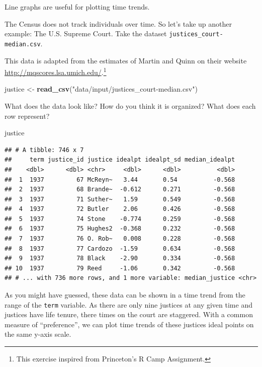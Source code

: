 \documentclass[]{book}
\newenvironment{Shaded}{\begin{snugshade}}{\end{snugshade}}
\newcommand{\KeywordTok}[1]{\textcolor[rgb]{0.13,0.29,0.53}{\textbf{#1}}}
\newcommand{\StringTok}[1]{\textcolor[rgb]{0.31,0.60,0.02}{#1}}
\newcommand{\NormalTok}[1]{#1}
\let\rmarkdownfootnote\footnote%
\def\footnote{\protect\rmarkdownfootnote}
\theoremstyle{definition}
\theoremstyle{definition}
\theoremstyle{definition}
\theoremstyle{remark}
\begin{document}
Line graphs are useful for plotting time trends.

The Census does not track individuals over time. So let's take up
another example: The U.S. Supreme Court. Take the dataset
\texttt{justices\_court-median.csv}.

This data is adapted from the estimates of Martin and Quinn on their
website \url{http://mqscores.lsa.umich.edu/}.\footnote{This exercise
  inspired from Princeton's R Camp Assignment.}

\begin{Shaded}
\begin{Highlighting}[]
\NormalTok{justice <-}\StringTok{ }\KeywordTok{read_csv}\NormalTok{(}\StringTok{"data/input/justices_court-median.csv"}\NormalTok{)}
\end{Highlighting}
\end{Shaded}

What does the data look like? How do you think it is organized? What
does each row represent?

\begin{Shaded}
\begin{Highlighting}[]
\NormalTok{justice}
\end{Highlighting}
\end{Shaded}

\begin{verbatim}
## # A tibble: 746 x 7
##     term justice_id justice idealpt idealpt_sd median_idealpt
##    <dbl>      <dbl> <chr>     <dbl>      <dbl>          <dbl>
##  1  1937         67 McReyn~   3.44       0.54          -0.568
##  2  1937         68 Brande~  -0.612      0.271         -0.568
##  3  1937         71 Suther~   1.59       0.549         -0.568
##  4  1937         72 Butler    2.06       0.426         -0.568
##  5  1937         74 Stone    -0.774      0.259         -0.568
##  6  1937         75 Hughes2  -0.368      0.232         -0.568
##  7  1937         76 O. Rob~   0.008      0.228         -0.568
##  8  1937         77 Cardozo  -1.59       0.634         -0.568
##  9  1937         78 Black    -2.90       0.334         -0.568
## 10  1937         79 Reed     -1.06       0.342         -0.568
## # ... with 736 more rows, and 1 more variable: median_justice <chr>
\end{verbatim}

As you might have guessed, these data can be shown in a time trend from
the range of the \texttt{term} variable. As there are only nine justices
at any given time and justices have life tenure, there times on the
court are staggered. With a common measure of ``preference'', we can
plot time trends of these justices ideal points on the same y-axis
scale.
\end{document}
